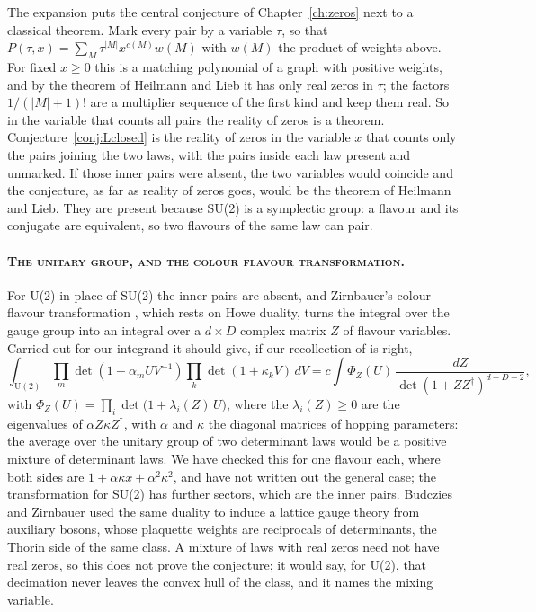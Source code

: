 The expansion puts the central conjecture of Chapter~\ref{ch:zeros} next to a classical theorem. Mark every pair by a variable $\tau$, so that $P(\tau,x)=\sum_M\tau^{|M|}x^{c(M)}w(M)$ with $w(M)$ the product of weights above. For fixed $x\ge0$ this is a matching polynomial of a graph with positive weights, and by the theorem of Heilmann and Lieb \cite{HL72} it has only real zeros in $\tau$; the factors $1/(|M|+1)!$ are a multiplier sequence of the first kind and keep them real. So in the variable that counts all pairs the reality of zeros is a theorem. Conjecture~\ref{conj:Lclosed} is the reality of zeros in the variable $x$ that counts only the pairs joining the two laws, with the pairs inside each law present and unmarked. If those inner pairs were absent, the two variables would coincide and the conjecture, as far as reality of zeros goes, would be the theorem of Heilmann and Lieb. They are present because SU(2) is a symplectic group: a flavour and its conjugate are equivalent, so two flavours of the same law can pair.

\paragraph{\normalfont\scshape The unitary group, and the colour flavour transformation.} For U(2) in place of SU(2) the inner pairs are absent, and Zirnbauer's colour flavour transformation \cite{Zi96}, which rests on Howe duality, turns the integral over the gauge group into an integral over a $d\times D$ complex matrix $Z$ of flavour variables. Carried out for our integrand it should give, if our recollection of \cite{Zi96} is right,
\[
\int_{\mathrm U(2)}\prod_m\det(1+\alpha_mUV^{-1})\prod_k\det(1+\kappa_kV)\,dV
=c\int\Phi_Z(U)\,\frac{dZ}{\det(1+ZZ^\dagger)^{d+D+2}},
\]
with $\Phi_Z(U)=\prod_i\det\big(1+\lambda_i(Z)\,U\big)$, where the $\lambda_i(Z)\ge0$ are the eigenvalues of $\alpha Z\kappa Z^\dagger$, with $\alpha$ and $\kappa$ the diagonal matrices of hopping parameters: the average over the unitary group of two determinant laws would be a positive mixture of determinant laws. We have checked this for one flavour each, where both sides are $1+\alpha\kappa x+\alpha^2\kappa^2$, and have not written out the general case; the transformation for SU(2) has further sectors, which are the inner pairs. Budczies and Zirnbauer \cite{BZ03} used the same duality to induce a lattice gauge theory from auxiliary bosons, whose plaquette weights are reciprocals of determinants, the Thorin side of the same class. A mixture of laws with real zeros need not have real zeros, so this does not prove the conjecture; it would say, for U(2), that decimation never leaves the convex hull of the class, and it names the mixing variable.

